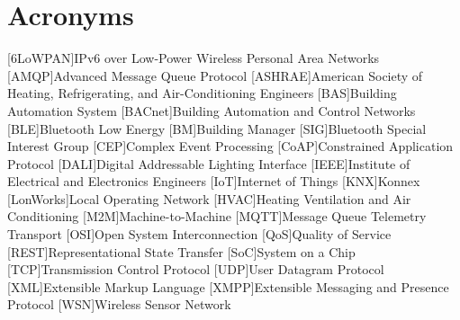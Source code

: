 \chapter{Acronyms}

\footnotesize
\SingleSpacing

\begin{multicols}{2}
\begin{acronym}[AAAAAA]
	[6LoWPAN]{IPv6 over Low-Power Wireless Personal Area Networks}
	[AMQP]{Advanced Message Queue Protocol}
	[ASHRAE]{American Society of Heating, Refrigerating, and Air-Conditioning Engineers}
	[BAS]{Building Automation System}
	[BACnet]{Building Automation and Control Networks}
	[BLE]{Bluetooth Low Energy}
	[BM]{Building Manager}
	[SIG]{Bluetooth Special Interest Group}
	[CEP]{Complex Event Processing}
	[CoAP]{Constrained Application Protocol}
	[DALI]{Digital Addressable Lighting Interface}
	[IEEE]{Institute of Electrical and Electronics Engineers}
	[IoT]{Internet of Things}
	[KNX]{Konnex}
	[LonWorks]{Local Operating Network}
	[HVAC]{Heating Ventilation and Air Conditioning}
	[M2M]{Machine-to-Machine}
	[MQTT]{Message Queue Telemetry Transport}
	[OSI]{Open System Interconnection}
	[QoS]{Quality of Service}
	[REST]{Representational State Transfer}
	[SoC]{System on a Chip}
	[TCP]{Transmission Control Protocol}
	[UDP]{User Datagram Protocol}
	[XML]{Extensible Markup Language}
	[XMPP]{Extensible Messaging and Presence Protocol}
	[WSN]{Wireless Sensor Network}
	


\end{acronym}
\end{multicols}

